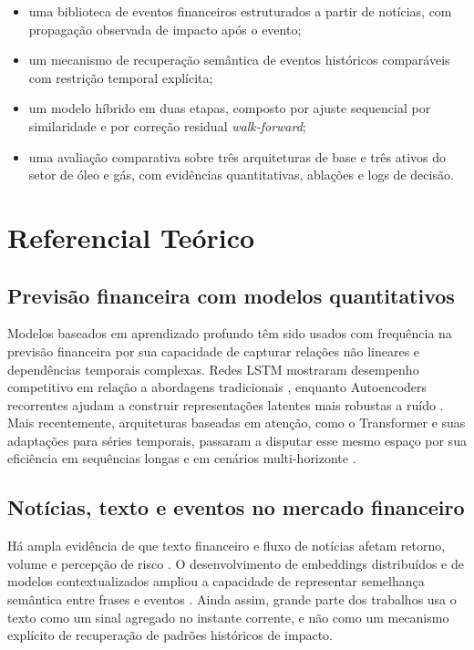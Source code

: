 \documentclass[12pt]{article}
\begin{document}
\begin{itemize}
    \item uma biblioteca de eventos financeiros estruturados a partir de notícias, com propagação observada de impacto após o evento;
    \item um mecanismo de recuperação semântica de eventos históricos comparáveis com restrição temporal explícita;
    \item um modelo híbrido em duas etapas, composto por ajuste sequencial por similaridade e por correção residual \textit{walk-forward};
    \item uma avaliação comparativa sobre três arquiteturas de base e três ativos do setor de óleo e gás, com evidências quantitativas, ablações e logs de decisão.
\end{itemize}

\section{Referencial Teórico}

\subsection{Previsão financeira com modelos quantitativos}

Modelos baseados em aprendizado profundo têm sido usados com frequência na previsão financeira por sua capacidade de capturar relações não lineares e dependências temporais complexas. Redes LSTM mostraram desempenho competitivo em relação a abordagens tradicionais \cite{Fischer:2018}, enquanto Autoencoders recorrentes ajudam a construir representações latentes mais robustas a ruído \cite{Bao:2017}. Mais recentemente, arquiteturas baseadas em atenção, como o Transformer e suas adaptações para séries temporais, passaram a disputar esse mesmo espaço por sua eficiência em sequências longas e em cenários multi-horizonte \cite{Vaswani:2017, Lim:2021, Wu:2021}.

\subsection{Notícias, texto e eventos no mercado financeiro}

Há ampla evidência de que texto financeiro e fluxo de notícias afetam retorno, volume e percepção de risco \cite{Tetlock:2007, Tetlock:2008, Loughran:2011, Mitra:2011}. O desenvolvimento de embeddings distribuídos e de modelos contextualizados ampliou a capacidade de representar semelhança semântica entre frases e eventos \cite{Mikolov:2013, Devlin:2019, Araci:2019, Reimers:2019}. Ainda assim, grande parte dos trabalhos usa o texto como um sinal agregado no instante corrente, e não como um mecanismo explícito de recuperação de padrões históricos de impacto.
\end{document}
